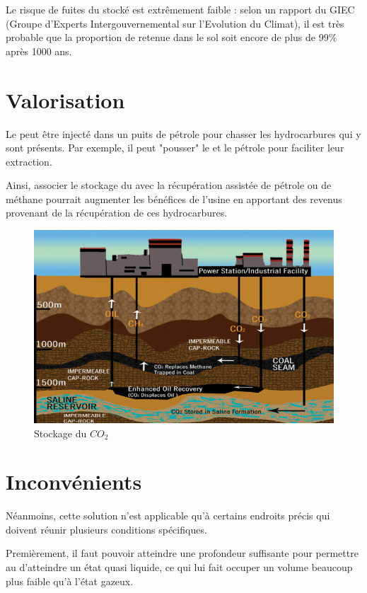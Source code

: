 \documentclass[a4, oneside, headings=normal]{scrartcl}
\begin{document}
Le risque de fuites du  stocké est extrêmement faible : selon un rapport du GIEC (Groupe d'Experts Intergouvernemental sur l'Evolution du Climat), il est très probable que la proportion de  retenue dans le sol soit encore de plus de 99\% après 1000 ans.

\section{Valorisation}
Le  peut être injecté dans un puits de pétrole pour chasser les hydrocarbures qui y sont présents. Par exemple, il peut "pousser" le  et le pétrole pour faciliter leur extraction.

Ainsi, associer le stockage du  avec la récupération assistée de pétrole ou de méthane pourrait augmenter les bénéfices de l'usine en apportant des revenus provenant de la récupération de ces hydrocarbures.

\begin{figure}[h!]
\caption{Stockage du $CO_2$ \protect \footnotemark}
\includegraphics[width=\textwidth]{captureee.png}
\end{figure}


\section{Inconvénients}

Néanmoins, cette solution n'est applicable qu'à certains endroits précis qui doivent réunir plusieurs conditions spécifiques. 

Premièrement, il faut pouvoir atteindre une profondeur suffisante pour permettre au  d'atteindre un état quasi liquide, ce qui lui fait occuper un volume beaucoup plus faible qu'à l'état gazeux.
\end{document}

